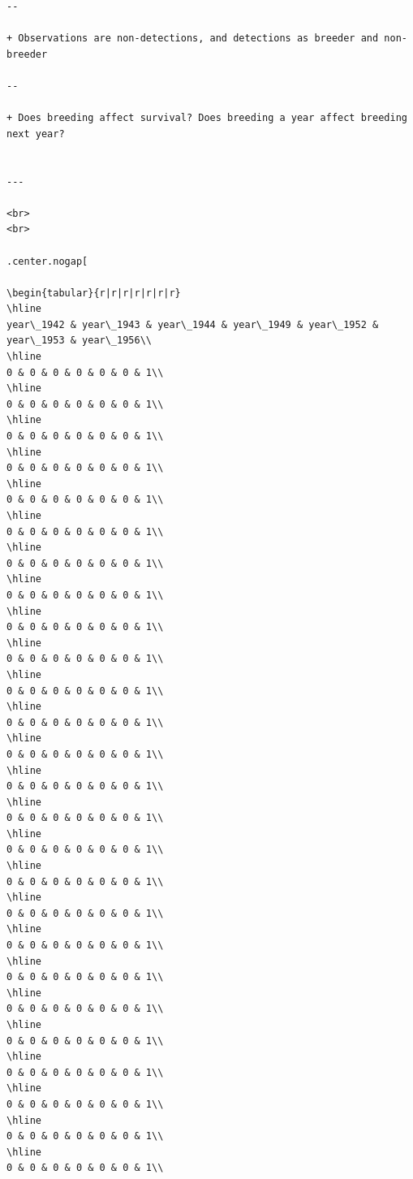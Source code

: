 \documentclass[
]{article}
\begin{document}
\begin{verbatim}
--

+ Observations are non-detections, and detections as breeder and non-breeder

--

+ Does breeding affect survival? Does breeding a year affect breeding next year?


---

<br>
<br>

.center.nogap[

\begin{tabular}{r|r|r|r|r|r|r}
\hline
year\_1942 & year\_1943 & year\_1944 & year\_1949 & year\_1952 & year\_1953 & year\_1956\\
\hline
0 & 0 & 0 & 0 & 0 & 0 & 1\\
\hline
0 & 0 & 0 & 0 & 0 & 0 & 1\\
\hline
0 & 0 & 0 & 0 & 0 & 0 & 1\\
\hline
0 & 0 & 0 & 0 & 0 & 0 & 1\\
\hline
0 & 0 & 0 & 0 & 0 & 0 & 1\\
\hline
0 & 0 & 0 & 0 & 0 & 0 & 1\\
\hline
0 & 0 & 0 & 0 & 0 & 0 & 1\\
\hline
0 & 0 & 0 & 0 & 0 & 0 & 1\\
\hline
0 & 0 & 0 & 0 & 0 & 0 & 1\\
\hline
0 & 0 & 0 & 0 & 0 & 0 & 1\\
\hline
0 & 0 & 0 & 0 & 0 & 0 & 1\\
\hline
0 & 0 & 0 & 0 & 0 & 0 & 1\\
\hline
0 & 0 & 0 & 0 & 0 & 0 & 1\\
\hline
0 & 0 & 0 & 0 & 0 & 0 & 1\\
\hline
0 & 0 & 0 & 0 & 0 & 0 & 1\\
\hline
0 & 0 & 0 & 0 & 0 & 0 & 1\\
\hline
0 & 0 & 0 & 0 & 0 & 0 & 1\\
\hline
0 & 0 & 0 & 0 & 0 & 0 & 1\\
\hline
0 & 0 & 0 & 0 & 0 & 0 & 1\\
\hline
0 & 0 & 0 & 0 & 0 & 0 & 1\\
\hline
0 & 0 & 0 & 0 & 0 & 0 & 1\\
\hline
0 & 0 & 0 & 0 & 0 & 0 & 1\\
\hline
0 & 0 & 0 & 0 & 0 & 0 & 1\\
\hline
0 & 0 & 0 & 0 & 0 & 0 & 1\\
\hline
0 & 0 & 0 & 0 & 0 & 0 & 1\\
\hline
0 & 0 & 0 & 0 & 0 & 0 & 1\\

\end{verbatim}
\end{document}
